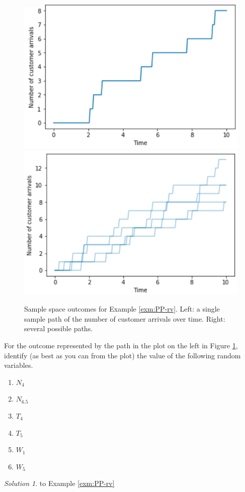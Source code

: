 \documentclass[
]{book}
\providecommand{\tightlist}{%
  \setlength{\itemsep}{0pt}\setlength{\parskip}{0pt}}
\theoremstyle{definition}
\theoremstyle{definition}
\theoremstyle{definition}
\theoremstyle{remark}
\newtheorem*{solution}{Solution}
\begin{document}
\begin{figure}
\includegraphics[width=0.5\linewidth]{_graphics/PP-path-one} \includegraphics[width=0.5\linewidth]{_graphics/PP-path-several} \caption{Sample space outcomes for Example \ref{exm:PP-rv}. Left: a single sample path of the number of customer arrivals over time. Right: several possible paths.}\label{fig:PP-rv-plot}
\end{figure}

For the outcome represented by the path in the plot on the left in Figure \ref{fig:PP-rv-plot}, identify (as best as you can from the plot) the value of the following random variables.

\begin{enumerate}
\def\labelenumi{\arabic{enumi}.}
\tightlist
\item
  \(N_4\)
\item
  \(N_{6.5}\)
\item
  \(T_4\)
\item
  \(T_5\)
\item
  \(W_1\)
\item
  \(W_5\)
\end{enumerate}

\begin{solution}
{}to Example \ref{exm:PP-rv}
\end{solution}
\end{document}
